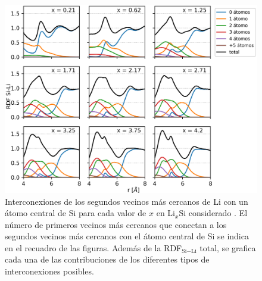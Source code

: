 \begin{figure}[h!]
    \centering
    \includegraphics[width=\textwidth]{Silicio/caracterizacion/resultados/interconexion/interconexiones.png}
    \caption{Interconexiones de los segundos vecinos más cercanos de Li con un 
    átomo central de Si para cada valor de $x$ en Li$_x$Si considerado \cite{ding2015}. El número 
    de primeros vecinos más cercanos que conectan a los segundos vecinos más 
    cercanos con el átomo central de Si se indica en el recuadro de las figuras. 
    Además de la RDF$_{\text{Si}-\text{Li}}$ total, se grafica cada una de las contribuciones 
    de los diferentes tipos de interconexiones posibles.}
    \label{fig:interconexiones}
\end{figure}

